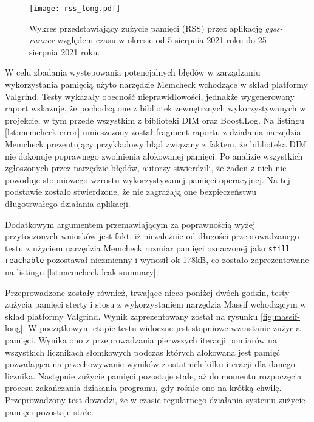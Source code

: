 \begin{figure}[H]
    \centering
    \texttt{[image: rss\_long.pdf]}
    \caption{Wykres przedstawiający zużycie pamięci (RSS) przez aplikację \emph{ggss-runner} względem czasu w okresie od 5 sierpnia 2021 roku do 25 sierpnia 2021 roku.}
    \label{fig:rss-long}
\end{figure}

W celu zbadania występowania potencjalnych błędów w zarządzaniu wykorzystania pamięcią użyto narzędzie Memcheck wchodzące w skład platformy Valgrind. Testy wykazały obecność nieprawidłowości, jednakże wygenerowany raport wskazuje, że pochodzą one z bibliotek zewnętrznych wykorzystywanych w projekcie, w tym przede wszystkim z biblioteki DIM oraz Boost.Log. Na listingu \ref{lst:memcheck-error} umieszczony został fragment raportu z działania narzędzia Memcheck prezentujący przykładowy błąd związany z faktem, że biblioteka DIM nie dokonuje poprawnego zwolnienia alokowanej pamięci. Po analizie wszystkich zgłoszonych przez narzędzie błędów, autorzy stwierdzili, że żaden z nich nie powoduje stopniowego wzrostu wykorzystywanej pamięci operacyjnej. Na tej podstawie zostało stwierdzone, że nie zagrażają one bezpieczeństwu długotrwałego działania aplikacji.



Dodatkowym argumentem przemawiającym za poprawnością wyżej przytoczonych wniosków jest fakt, iż niezależnie od długości przeprowadzanego testu z użyciem narzędzia Memcheck rozmiar pamięci oznaczonej jako \lstinline{still reachable} pozostawał niezmienny i wynosił ok 178kB, co zostało zaprezentowane na listingu \ref{lst:memcheck-leak-summary}.



Przeprowadzone zostały również, trwające nieco poniżej dwóch godzin, testy zużycia pamięci sterty i stosu z wykorzystaniem narzędzia Massif wchodzącym w skład platformy Valgrind. Wynik zaprezentowany został na rysunku \ref{fig:massif-long}. W początkowym etapie testu widoczne jest stopniowe wzrastanie zużycia pamięci. Wynika ono z  przeprowadzania pierwszych iteracji pomiarów na wszystkich licznikach słomkowych podczas których alokowana jest pamięć pozwalająca na przechowywanie wyników z ostatnich kilku iteracji dla danego licznika. Następnie zużycie pamięci pozostaje stałe, aż do momentu rozpoczęcia procesu zakańczania działania programu, gdy rośnie ono na krótką chwilę. Przeprowadzony test dowodzi, że w czasie regularnego działania systemu zużycie pamięci pozostaje stałe.

